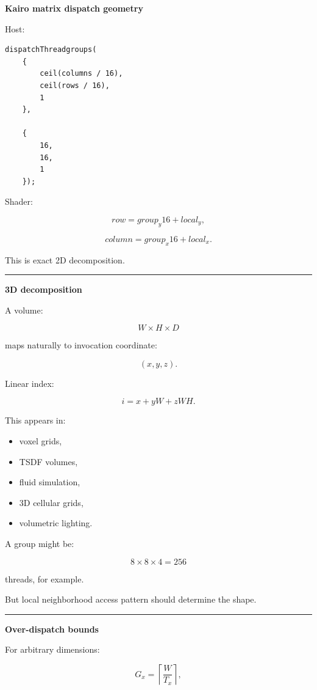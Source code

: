 \textbf{Kairo matrix dispatch geometry}

Host:

\protect{}\label{dgqe6p}%
\begin{verbatim}
dispatchThreadgroups(
    {
        ceil(columns / 16),
        ceil(rows / 16),
        1
    },

    {
        16,
        16,
        1
    });
\end{verbatim}

Shader:

\[
row=
group_y16+local_y,
\]

\[
column=
group_x16+local_x.
\]

This is exact 2D decomposition.

\begin{center}\rule{0.5\linewidth}{0.5pt}\end{center}

\textbf{3D decomposition}

A volume:

\[
W\times H\times D
\]

maps naturally to invocation coordinate:

\[
(x,y,z).
\]

Linear index:

\[
\boxed{
i=
x+
yW+
zWH.
}
\]

This appears in:

\begin{itemize}
\tightlist
\item
  voxel grids,
\item
  TSDF volumes,
\item
  fluid simulation,
\item
  3D cellular grids,
\item
  volumetric lighting.
\end{itemize}

A group might be:

\[
8\times8\times4
=
256
\]

threads, for example.

But local neighborhood access pattern should determine the shape.

\begin{center}\rule{0.5\linewidth}{0.5pt}\end{center}

\textbf{Over-dispatch bounds}

For arbitrary dimensions:

\[
G_x=
\left\lceil\frac{W}{T_x}\right\rceil,
\]

